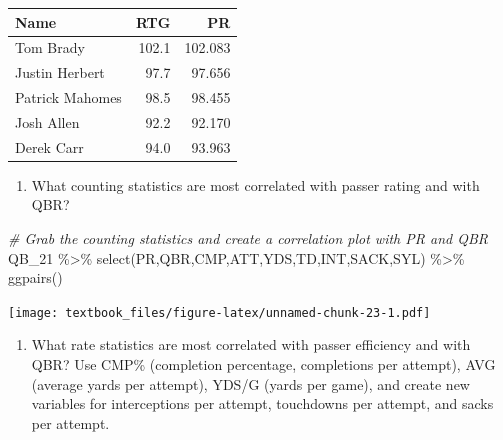 \documentclass[
  11pt,
]{book}
\newenvironment{Shaded}{\begin{snugshade}}{\end{snugshade}}
\newcommand{\CommentTok}[1]{\textcolor[rgb]{0.56,0.35,0.01}{\textit{#1}}}
\newcommand{\FunctionTok}[1]{\textcolor[rgb]{0.00,0.00,0.00}{#1}}
\newcommand{\NormalTok}[1]{#1}
\newcommand{\SpecialCharTok}[1]{\textcolor[rgb]{0.00,0.00,0.00}{#1}}
\providecommand{\tightlist}{%
  \setlength{\itemsep}{0pt}\setlength{\parskip}{0pt}}
\theoremstyle{definition}
\theoremstyle{definition}
\theoremstyle{definition}
\theoremstyle{definition}
\theoremstyle{remark}
\begin{document}
\begin{table}[H]
\centering
\begin{tabular}{lrr}
\toprule
Name & RTG & PR\\
\midrule
Tom Brady & 102.1 & 102.083\\
Justin Herbert & 97.7 & 97.656\\
Patrick Mahomes & 98.5 & 98.455\\
Josh Allen & 92.2 & 92.170\\
Derek Carr & 94.0 & 93.963\\
\bottomrule
\end{tabular}
\end{table}

\begin{enumerate}
\def\labelenumi{(\alph{enumi})}
\setcounter{enumi}{1}
\tightlist
\item
  What counting statistics are most correlated with passer rating and with QBR?
\end{enumerate}

\begin{Shaded}
\begin{Highlighting}[]
\CommentTok{\# Grab the counting statistics and create a correlation plot with PR and QBR}
\NormalTok{QB\_21 }\SpecialCharTok{\%\textgreater{}\%} \FunctionTok{select}\NormalTok{(PR,QBR,CMP,ATT,YDS,TD,INT,SACK,SYL) }\SpecialCharTok{\%\textgreater{}\%} \FunctionTok{ggpairs}\NormalTok{()}
\end{Highlighting}
\end{Shaded}

\texttt{[image: textbook\_files/figure-latex/unnamed-chunk-23-1.pdf]}

\begin{enumerate}
\def\labelenumi{(\alph{enumi})}
\setcounter{enumi}{2}
\tightlist
\item
  What rate statistics are most correlated with passer efficiency and with QBR? Use CMP\% (completion percentage, completions per attempt), AVG (average yards per attempt), YDS/G (yards per game), and create new variables for interceptions per attempt, touchdowns per attempt, and sacks per attempt.
\end{enumerate}
\end{document}
